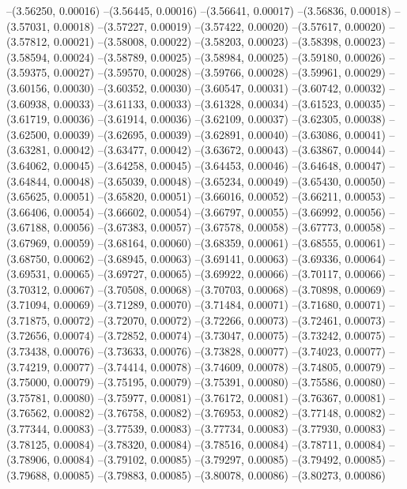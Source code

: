 --(3.56250, 0.00016)
--(3.56445, 0.00016)
--(3.56641, 0.00017)
--(3.56836, 0.00018)
--(3.57031, 0.00018)
--(3.57227, 0.00019)
--(3.57422, 0.00020)
--(3.57617, 0.00020)
--(3.57812, 0.00021)
--(3.58008, 0.00022)
--(3.58203, 0.00023)
--(3.58398, 0.00023)
--(3.58594, 0.00024)
--(3.58789, 0.00025)
--(3.58984, 0.00025)
--(3.59180, 0.00026)
--(3.59375, 0.00027)
--(3.59570, 0.00028)
--(3.59766, 0.00028)
--(3.59961, 0.00029)
--(3.60156, 0.00030)
--(3.60352, 0.00030)
--(3.60547, 0.00031)
--(3.60742, 0.00032)
--(3.60938, 0.00033)
--(3.61133, 0.00033)
--(3.61328, 0.00034)
--(3.61523, 0.00035)
--(3.61719, 0.00036)
--(3.61914, 0.00036)
--(3.62109, 0.00037)
--(3.62305, 0.00038)
--(3.62500, 0.00039)
--(3.62695, 0.00039)
--(3.62891, 0.00040)
--(3.63086, 0.00041)
--(3.63281, 0.00042)
--(3.63477, 0.00042)
--(3.63672, 0.00043)
--(3.63867, 0.00044)
--(3.64062, 0.00045)
--(3.64258, 0.00045)
--(3.64453, 0.00046)
--(3.64648, 0.00047)
--(3.64844, 0.00048)
--(3.65039, 0.00048)
--(3.65234, 0.00049)
--(3.65430, 0.00050)
--(3.65625, 0.00051)
--(3.65820, 0.00051)
--(3.66016, 0.00052)
--(3.66211, 0.00053)
--(3.66406, 0.00054)
--(3.66602, 0.00054)
--(3.66797, 0.00055)
--(3.66992, 0.00056)
--(3.67188, 0.00056)
--(3.67383, 0.00057)
--(3.67578, 0.00058)
--(3.67773, 0.00058)
--(3.67969, 0.00059)
--(3.68164, 0.00060)
--(3.68359, 0.00061)
--(3.68555, 0.00061)
--(3.68750, 0.00062)
--(3.68945, 0.00063)
--(3.69141, 0.00063)
--(3.69336, 0.00064)
--(3.69531, 0.00065)
--(3.69727, 0.00065)
--(3.69922, 0.00066)
--(3.70117, 0.00066)
--(3.70312, 0.00067)
--(3.70508, 0.00068)
--(3.70703, 0.00068)
--(3.70898, 0.00069)
--(3.71094, 0.00069)
--(3.71289, 0.00070)
--(3.71484, 0.00071)
--(3.71680, 0.00071)
--(3.71875, 0.00072)
--(3.72070, 0.00072)
--(3.72266, 0.00073)
--(3.72461, 0.00073)
--(3.72656, 0.00074)
--(3.72852, 0.00074)
--(3.73047, 0.00075)
--(3.73242, 0.00075)
--(3.73438, 0.00076)
--(3.73633, 0.00076)
--(3.73828, 0.00077)
--(3.74023, 0.00077)
--(3.74219, 0.00077)
--(3.74414, 0.00078)
--(3.74609, 0.00078)
--(3.74805, 0.00079)
--(3.75000, 0.00079)
--(3.75195, 0.00079)
--(3.75391, 0.00080)
--(3.75586, 0.00080)
--(3.75781, 0.00080)
--(3.75977, 0.00081)
--(3.76172, 0.00081)
--(3.76367, 0.00081)
--(3.76562, 0.00082)
--(3.76758, 0.00082)
--(3.76953, 0.00082)
--(3.77148, 0.00082)
--(3.77344, 0.00083)
--(3.77539, 0.00083)
--(3.77734, 0.00083)
--(3.77930, 0.00083)
--(3.78125, 0.00084)
--(3.78320, 0.00084)
--(3.78516, 0.00084)
--(3.78711, 0.00084)
--(3.78906, 0.00084)
--(3.79102, 0.00085)
--(3.79297, 0.00085)
--(3.79492, 0.00085)
--(3.79688, 0.00085)
--(3.79883, 0.00085)
--(3.80078, 0.00086)
--(3.80273, 0.00086)
